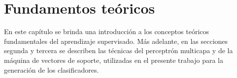 %
%
%
%
\iflatexml{}\else\setcounter{chapter}{1}\fi%
%
\chapter{Fundamentos teóricos}
%
En este capítulo se brinda una introducción a los conceptos teóricos
fundamentales del aprendizaje supervisado.
Más adelante, en las secciones segunda y tercera se describen las
técnicas del perceptrón multicapa y de la máquina de vectores de
soporte, utilizadas en el presente trabajo para la generación de los
clasificadores.
